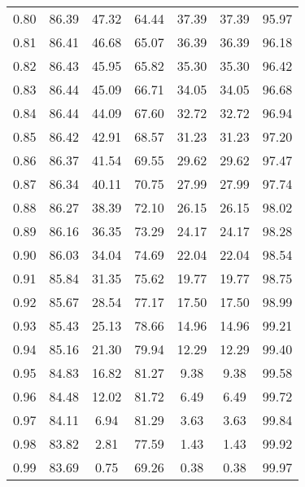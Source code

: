 \begin{tabular}{|c|c|c|c|c|c|c|}
      0.80 &     86.39 &     47.32 &      64.44 &   37.39 &      37.39 &         95.97 \\
      0.81 &     86.41 &     46.68 &      65.07 &   36.39 &      36.39 &         96.18 \\
      0.82 &     86.43 &     45.95 &      65.82 &   35.30 &      35.30 &         96.42 \\
      0.83 &     86.44 &     45.09 &      66.71 &   34.05 &      34.05 &         96.68 \\
      0.84 &     86.44 &     44.09 &      67.60 &   32.72 &      32.72 &         96.94 \\
      0.85 &     86.42 &     42.91 &      68.57 &   31.23 &      31.23 &         97.20 \\
      0.86 &     86.37 &     41.54 &      69.55 &   29.62 &      29.62 &         97.47 \\
      0.87 &     86.34 &     40.11 &      70.75 &   27.99 &      27.99 &         97.74 \\
      0.88 &     86.27 &     38.39 &      72.10 &   26.15 &      26.15 &         98.02 \\
      0.89 &     86.16 &     36.35 &      73.29 &   24.17 &      24.17 &         98.28 \\
      0.90 &     86.03 &     34.04 &      74.69 &   22.04 &      22.04 &         98.54 \\
      0.91 &     85.84 &     31.35 &      75.62 &   19.77 &      19.77 &         98.75 \\
      0.92 &     85.67 &     28.54 &      77.17 &   17.50 &      17.50 &         98.99 \\
      0.93 &     85.43 &     25.13 &      78.66 &   14.96 &      14.96 &         99.21 \\
      0.94 &     85.16 &     21.30 &      79.94 &   12.29 &      12.29 &         99.40 \\
      0.95 &     84.83 &     16.82 &      81.27 &    9.38 &       9.38 &         99.58 \\
      0.96 &     84.48 &     12.02 &      81.72 &    6.49 &       6.49 &         99.72 \\
      0.97 &     84.11 &      6.94 &      81.29 &    3.63 &       3.63 &         99.84 \\
      0.98 &     83.82 &      2.81 &      77.59 &    1.43 &       1.43 &         99.92 \\
      0.99 &     83.69 &      0.75 &      69.26 &    0.38 &       0.38 &         99.97 \\
\bottomrule
\end{tabular}
